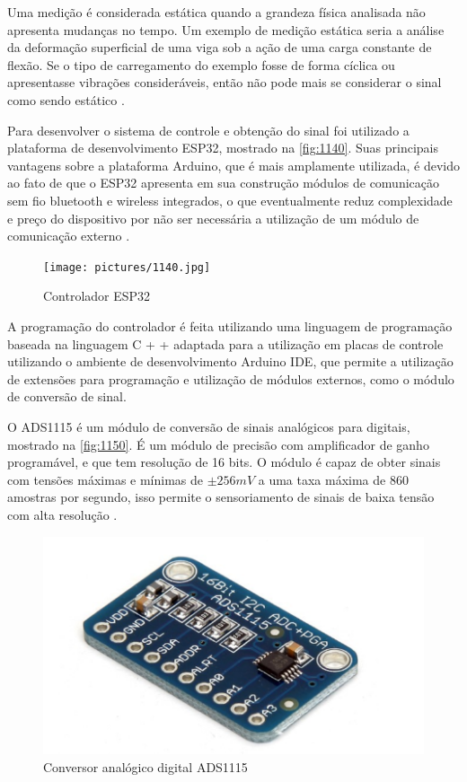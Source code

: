 Uma medição é considerada estática quando a grandeza física analisada não apresenta mudanças no tempo.
Um exemplo de medição estática seria a análise da deformação superficial de uma viga sob a ação de uma carga constante de flexão.
Se o tipo de carregamento do exemplo fosse de forma cíclica ou apresentasse vibrações consideráveis, então não pode mais se considerar o sinal como sendo estático \autocite{Hollman2011}.

Para desenvolver o sistema de controle e obtenção do sinal foi utilizado a plataforma de desenvolvimento ESP32, mostrado na \autoref{fig:1140}.
Suas principais vantagens sobre a plataforma Arduino, que é mais amplamente utilizada, é devido ao fato de que o ESP32 apresenta em sua construção módulos de comunicação sem fio bluetooth
e wireless integrados, o que eventualmente reduz complexidade e preço do dispositivo por não ser necessária a utilização de um módulo de comunicação externo \autocite{DocsESP32}.

\begin{figure}[htb]
	\caption{\label{fig:1140} Controlador ESP32}
	\begin{center}
		\texttt{[image: pictures/1140.jpg]}
	\end{center}
\end{figure}

A programação do controlador é feita utilizando uma linguagem de programação baseada na linguagem C + + adaptada para a utilização em placas de controle utilizando o ambiente
de desenvolvimento Arduino IDE, que permite a utilização de extensões para programação e utilização de módulos externos, como o módulo de conversão de sinal.

O ADS1115 é um módulo de conversão de sinais analógicos para digitais, mostrado na \autoref{fig:1150}.
É um módulo de precisão com amplificador de ganho programável, e que tem resolução de 16 bits.
O módulo é capaz de obter sinais com tensões máximas e mínimas de ${\pm 256}{mV}$ a uma taxa máxima de 860 amostras por segundo,
isso permite o sensoriamento de sinais de baixa tensão com alta resolução \autocite{DocsADS115}.

\begin{figure}[htb]
	\caption{\label{fig:1150} Conversor analógico digital ADS1115}
	\begin{center}
		\includegraphics[width=\textwidth]{pictures/1150.png}
	\end{center}
\end{figure}

